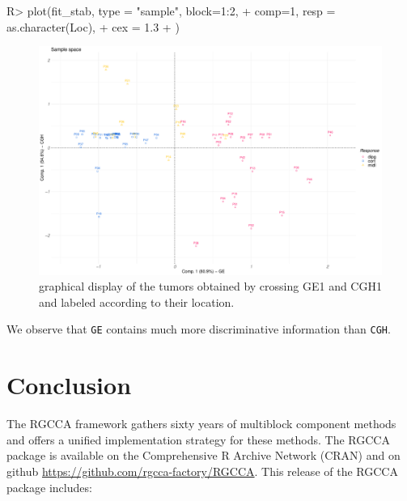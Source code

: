 \documentclass[
]{jss}
\begin{document}
\begin{CodeChunk}
\begin{CodeInput}
R> plot(fit_stab, type = "sample", block=1:2, 
+      comp=1, resp = as.character(Loc), 
+      cex = 1.3
+      )
\end{CodeInput}
\begin{figure}

{\centering \includegraphics{RGCCA_vignette_files/figure-latex/unnamed-chunk-53-1} 

}

\caption[graphical display of the tumors obtained by crossing GE1 and CGH1 and labeled according to their location]{graphical display of the tumors obtained by crossing GE1 and CGH1 and labeled according to their location.}\label{fig:unnamed-chunk-53}
\end{figure}
\end{CodeChunk}

\normalsize

We observe that \texttt{GE} contains much more discriminative
information than \texttt{CGH}.

\hypertarget{conclusion}{%
\section{Conclusion}\label{conclusion}}

The RGCCA framework gathers sixty years of multiblock component methods
and offers a unified implementation strategy for these methods. The
RGCCA package is available on the Comprehensive R Archive Network (CRAN)
and on github \url{https://github.com/rgcca-factory/RGCCA}. This release
of the RGCCA package includes:
\end{document}
